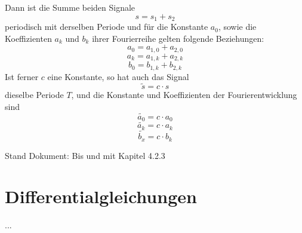 \documentclass[10pt,a4paper]{scrartcl}
\begin{document}
Dann ist die Summe beiden Signale
$$s = s_1 + s_2$$
periodisch mit derselben Periode und für die Konstante $a_0$, sowie die
Koeffizienten $a_k$ und $b_k$ ihrer Fourierreihe gelten folgende Beziehungen:
$$a_0 = a_{1,0} + a_{2,0}$$
$$a_k = a_{1,k} + a_{2,k}$$
$$b_0 = b_{1,k} + b_{2,k}$$
Ist ferner $c$ eine Konstante, so hat auch das Signal
$$\tilde{s} = c \cdot s$$
dieselbe Periode $T$, und die Konstante und Koeffizienten der
Fourierentwicklung sind
$$\tilde{a_0} = c \cdot a_0$$
$$\tilde{a_k} = c \cdot a_k$$
$$\tilde{b_x} = c \cdot b_k$$

\vspace{120mm}
Stand Dokument: Bis und mit Kapitel 4.2.3


\section{Differentialgleichungen}

...
\end{document}
